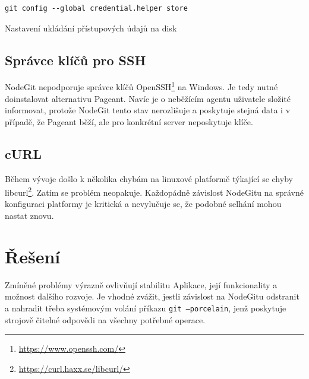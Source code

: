\FloatBarrier
\begin{listing}[ht]
	\begin{verbatim}
git config --global credential.helper store
	\end{verbatim}
	\caption{Nastavení ukládání přístupových údajů na disk}
\end{listing}
\FloatBarrier

\subsection{Správce klíčů pro SSH}

NodeGit nepodporuje správce klíčů OpenSSH\footnote{\url{https://www.openssh.com/}} na Windows. Je tedy nutné doinstalovat alternativu Pageant. Navíc je o neběžícím agentu uživatele složité informovat, protože NodeGit tento stav nerozlišuje a poskytuje stejná data i v případě, že Pageant běží, ale pro konkrétní server neposkytuje klíče.

\subsection{cURL}

Během vývoje došlo k několika chybám na linuxové platformě týkající se chyby libcurl\footnote{\url{https://curl.haxx.se/libcurl/}}. Zatím se problém neopakuje. Každopádně závislost NodeGitu na správné konfiguraci platformy je kritická a nevylučuje se, že podobné selhání mohou nastat znovu.

\section{Řešení}

Zmíněné problémy výrazně ovlivňují stabilitu Aplikace, její funkcionality a možnost dalšího rozvoje. Je vhodné zvážit, jestli závislost na NodeGitu odstranit a nahradit třeba systémovým volání příkazu \texttt{git --porcelain}, jenž poskytuje strojově čitelné odpovědi na všechny potřebné operace.

